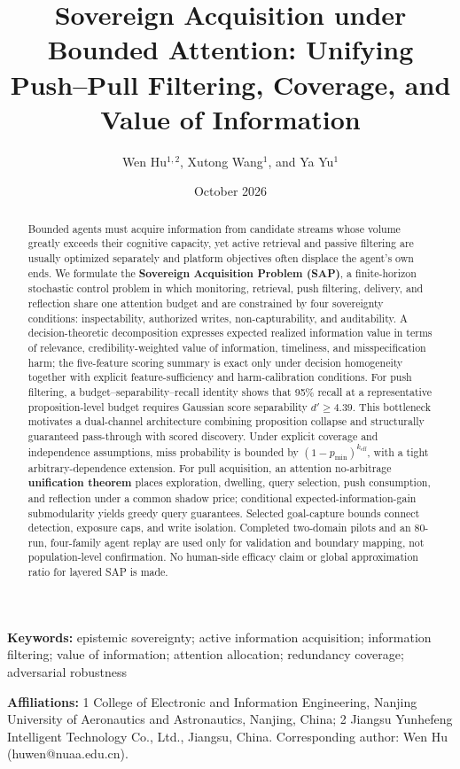 \documentclass[
  11pt]{article}
\title{Sovereign Acquisition under Bounded Attention: Unifying Push--Pull Filtering, Coverage, and Value of Information}
\author{Wen Hu\(^{1,2}\), Xutong Wang\(^{1}\), and Ya Yu\(^{1}\)}
\date{October 2026}
\begin{document}
\maketitle
\begin{abstract}
Bounded agents must acquire information from candidate streams whose volume greatly exceeds their cognitive capacity, yet active retrieval and passive filtering are usually optimized separately and platform objectives often displace the agent's own ends. We formulate the \textbf{Sovereign Acquisition Problem (SAP)}, a finite-horizon stochastic control problem in which monitoring, retrieval, push filtering, delivery, and reflection share one attention budget and are constrained by four sovereignty conditions: inspectability, authorized writes, non-capturability, and auditability. A decision-theoretic decomposition expresses expected realized information value in terms of relevance, credibility-weighted value of information, timeliness, and misspecification harm; the five-feature scoring summary is exact only under decision homogeneity together with explicit feature-sufficiency and harm-calibration conditions. For push filtering, a budget--separability--recall identity shows that 95\% recall at a representative proposition-level budget requires Gaussian score separability \(d'\geq4.39\). This bottleneck motivates a dual-channel architecture combining proposition collapse and structurally guaranteed pass-through with scored discovery. Under explicit coverage and independence assumptions, miss probability is bounded by \((1-p_{\min})^{k_{\mathrm{eff}}}\), with a tight arbitrary-dependence extension. For pull acquisition, an attention no-arbitrage \textbf{unification theorem} places exploration, dwelling, query selection, push consumption, and reflection under a common shadow price; conditional expected-information-gain submodularity yields greedy query guarantees. Selected goal-capture bounds connect detection, exposure caps, and write isolation. Completed two-domain pilots and an 80-run, four-family agent replay are used only for validation and boundary mapping, not population-level confirmation. No human-side efficacy claim or global approximation ratio for layered SAP is made.
\end{abstract}

\textbf{Keywords:} epistemic sovereignty; active information acquisition; information filtering; value of information; attention allocation; redundancy coverage; adversarial robustness

\textbf{Affiliations:} 1 College of Electronic and Information Engineering, Nanjing University of Aeronautics and Astronautics, Nanjing, China; 2 Jiangsu Yunhefeng Intelligent Technology Co., Ltd., Jiangsu, China. Corresponding author: Wen Hu (huwen@nuaa.edu.cn).
\end{document}
